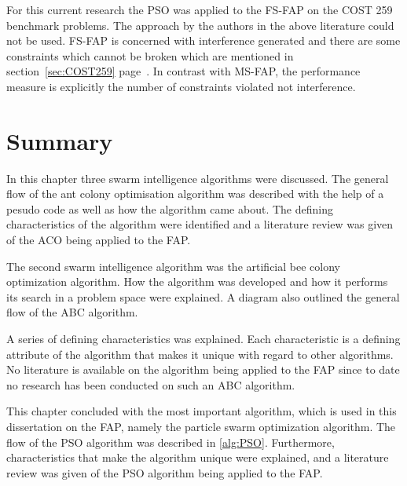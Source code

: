 For this current research the \gls{PSO} was applied to the \gls{FS-FAP} on the \gls{COST} 259 benchmark problems. The approach by the authors in the above literature could not be used. \gls{FS-FAP} is concerned with interference generated and there are some constraints which cannot be broken which are mentioned in section~\ref{sec:COST259} page~\pageref{sec:COST259}. In contrast with \gls{MS-FAP}, the performance measure is explicitly the number of constraints violated not interference.

\section{Summary}
\label{sec:SISummary}
In this chapter three swarm intelligence algorithms were discussed. The general flow of the ant colony optimisation algorithm was described with the help of a pesudo code as well as how the algorithm came about. The defining characteristics of the algorithm were identified and a literature review was given of the \gls{ACO} being applied to the \gls{FAP}.

The second swarm intelligence algorithm was the artificial bee colony optimization algorithm. How the algorithm was developed and how it performs its search in a problem space were explained. A diagram also outlined the general flow of the \gls{ABC} algorithm.

A series of defining characteristics was explained. Each characteristic is a defining attribute of the algorithm that makes it unique with regard to other algorithms. No literature is available on the algorithm being applied to the \gls{FAP} since to date no research has been conducted on such an \gls{ABC} algorithm.

This chapter concluded with the most important algorithm, which is used in this dissertation on the \gls{FAP}, namely the particle swarm optimization algorithm. The flow of the \gls{PSO} algorithm was described in \ref{alg:PSO}. Furthermore, characteristics that make the algorithm unique were explained, and a literature review was given of the \gls{PSO} algorithm being applied to the \gls{FAP}.
